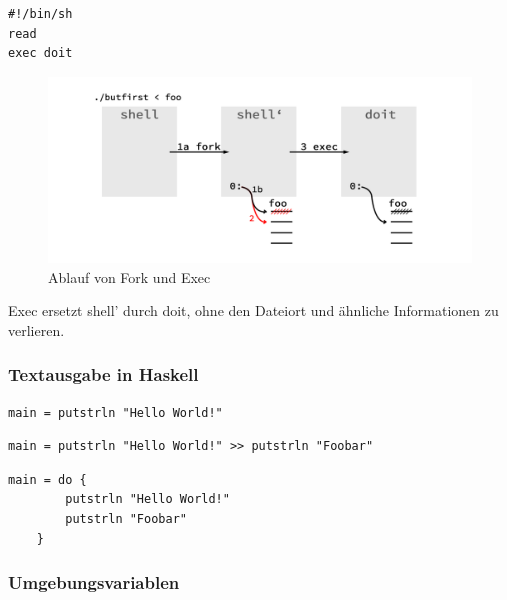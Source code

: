 		\lstShell
		\begin{lstlisting}
#!/bin/sh
read
exec doit
		\end{lstlisting}

		\begin{figure}[th]
			\caption{Ablauf von Fork und Exec}
			\includegraphics[width=\textwidth]{workfiles/v2_4}
		\end{figure}
		
		Exec ersetzt shell' durch doit, ohne den Dateiort und ähnliche Informationen zu verlieren.




	\subsubsection*{Textausgabe in Haskell} %
	\label{ssub:textausgabe_in_haskell}
	
		\lstHaskell
		\begin{lstlisting}
main = putstrln "Hello World!"
		\end{lstlisting}

		\begin{lstlisting}
main = putstrln "Hello World!" >> putstrln "Foobar"
		\end{lstlisting}

		\begin{lstlisting}
main = do {
		putstrln "Hello World!"
		putstrln "Foobar"
	}
		\end{lstlisting}


	\subsubsection*{Umgebungsvariablen} %
	\label{ssub:umgebungsvariablen}

